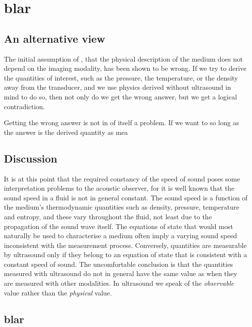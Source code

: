 \section{blar}

\subsection{An alternative view}
The initial assumption of \secref{}, that the physical description of the medium does not depend on the imaging modality, has been shown to be wrong.
If we try to derive the quantities of interest, such as the pressure, the temperature, or the density away from the transducer,
and we use physics derived without ultrasound in mind to do so, 
then not only do we get the wrong answer, 
but we get a logical contradiction.

Getting the wrong answer is not in of itself a problem.  
If we want to 
so long as the answer is the derived quantity as mea

\subsection{Discussion}


It is at this point that the required constancy of the speed of sound poses some interpretation problems to the acoustic observer,
for it is well known that the sound speed in a fluid is not in general constant.
The sound speed is a function of the medium's thermodynamic quantities such as  density, pressure, temperature and entropy,
and these vary throughout the fluid, not least due to the propagation of the sound wave itself.
The equations of state that would most naturally be used to characterise a medium often imply a varying sound speed inconsistent with the measurement process.
Conversely, quantities are measurable by ultrasound only if they belong to an equation of state that is consistent with a constant speed of sound.
The uncomfortable conclusion is that the quantities measured with ultrasound do not in general have the same value as when they are measured with other modalities.
In ultrasound we speak of the  {\em observable} value rather than the {\em physical} value.



\subsection{blar}





